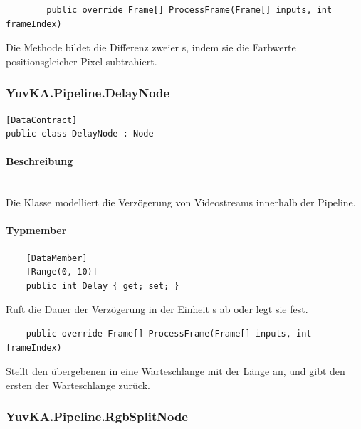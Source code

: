 \begin{itemize}
	\begin{verbatim}
		public override Frame[] ProcessFrame(Frame[] inputs, int frameIndex)
	\end{verbatim}
Die Methode  bildet die Differenz zweier s, indem sie die Farbwerte positionsgleicher Pixel subtrahiert.

\end{itemize}

\subsubsection{YuvKA.Pipeline.DelayNode}

\begin{verbatim}
[DataContract]
public class DelayNode : Node
\end{verbatim}

\paragraph{Beschreibung}~\\
Die Klasse  modelliert die Verzögerung von Videostreams innerhalb der Pipeline.

\paragraph{Typmember}
\begin{itemize}
	
	\begin{verbatim}
	[DataMember]
	[Range(0, 10)]
	public int Delay { get; set; }
	\end{verbatim}
	Ruft die Dauer der Verzögerung in der Einheit s ab oder legt sie fest.

	\begin{verbatim}
	public override Frame[] ProcessFrame(Frame[] inputs, int frameIndex)
	\end{verbatim}
	Stellt den übergebenen  in eine Warteschlange mit der Länge  an, und gibt den ersten  der Warteschlange zurück.
	
\end{itemize}

\subsubsection{YuvKA.Pipeline.RgbSplitNode}

